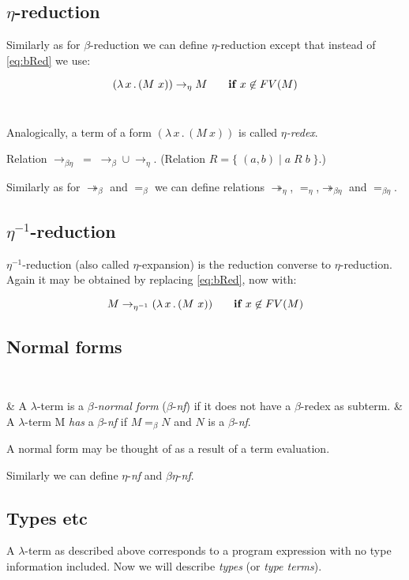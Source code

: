 \documentclass{sig-alternate}
\newcommand{\lterm}{$\lambda$-term\xspace}
\newcommand{\lamb}[2]{( \lambda \, #1 \, . \, #2 )}
\newcommand{\bbarr}{\twoheadrightarrow_\beta}
\newcommand{\barr}{\rightarrow_\beta}
\newcommand{\beq}{=_\beta}
\newcommand{\eearr}{\twoheadrightarrow_\eta}
\newcommand{\earr}{\rightarrow_\eta}
\newcommand{\eeq}{=_\eta}
\newcommand{\bearr}{\rightarrow_{\beta\eta}}
\newcommand{\bbeearr}{\twoheadrightarrow_{\beta\eta}}
\newcommand{\beeq}{=_{\beta\eta}}
\newcommand{\bnf}{$\beta$-\textit{nf}\xspace}
\newcommand{\enf}{$\eta$-\textit{nf}\xspace}
\newcommand{\benf}{$\beta\eta$-\textit{nf}\xspace}
\begin{document}
\subsection{$\eta$-reduction}

Similarly as for $\beta$-reduction we can define $\eta$-reduction 
except that instead of \ref{eq:bRed} we use:  

$$\lamb{x}{(M~x)} \eArrow M \textbf{ ~~~~if } x \not\in FV(M) $$~

Analogically, a term of a form $\lamb{x}{(M~x)}$ is called 
\textit{$\eta$-redex}.

Relation $\bearr\;=\;\barr \cup \earr$. 
(Relation $R = \{\;(a,b)\;|\;a\;R\;b\;\}$.)

Similarly as for $\bbarr$ and $\beq$ we can define relations 
$\eearr$, $\eeq$,$\bbeearr$ and $\beeq$.


\subsection{$\eta^{-1}$-reduction}

$\eta^{-1}$-reduction (also called $\eta$-expansion) is 
the reduction converse to $\eta$-reduction.
Again it may be obtained by replacing \ref{eq:bRed}, now with:  

$$M \eeArrow \lamb{x}{(M~x)} \textbf{ ~~~~if } x \not\in FV(M) $$




\subsection{Normal forms}

~\begin{easylist}[enumerate]
& A \lterm is a \textit{$\beta$-normal form} (\bnf) 
if it does not have a $\beta$-redex as subterm.
& A \lterm M \textit{has} a \bnf if $M \beq N$
and $N$ is a \bnf.\\
\end{easylist}
A normal form may be thought of as a result of a term evaluation. 

Similarly we can define \enf and \benf.



\subsection{Types etc}

A \lterm as described above
corresponds to a program expression with no type information
included. Now we will describe \textit{types} (or \textit{type terms}).
\end{document}
